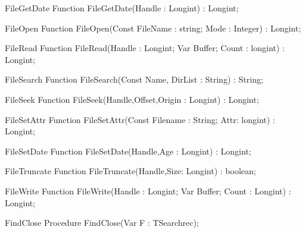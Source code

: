  
\begin{function}{FileGetDate}
\Declaration
Function FileGetDate(Handle : Longint) : Longint;
\Description
\Errors
\SeeAlso
\end{function}

 
\begin{function}{FileOpen}
\Declaration
Function FileOpen(Const FileName : string; Mode : Integer) : Longint;
\Description
\Errors
\SeeAlso
\end{function}

 
\begin{function}{FileRead}
\Declaration
Function FileRead(Handle : Longint; Var Buffer; Count : longint) : Longint;
\Description
\Errors
\SeeAlso
\end{function}

 
\begin{function}{FileSearch}
\Declaration
Function FileSearch(Const Name, DirList : String) : String;
\Description
\Errors
\SeeAlso
\end{function}

 
\begin{function}{FileSeek}
\Declaration
Function FileSeek(Handle,Offset,Origin : Longint) : Longint;
\Description
\Errors
\SeeAlso
\end{function}

 
\begin{function}{FileSetAttr}
\Declaration
Function FileSetAttr(Const Filename : String; Attr: longint) : Longint;
\Description
\Errors
\SeeAlso
\end{function}

 
\begin{function}{FileSetDate}
\Declaration
Function FileSetDate(Handle,Age : Longint) : Longint;
\Description
\Errors
\SeeAlso
\end{function}

 
\begin{function}{FileTruncate}
\Declaration
Function FileTruncate(Handle,Size: Longint) : boolean;
\Description
\Errors
\SeeAlso
\end{function}

 
\begin{function}{FileWrite}
\Declaration
Function FileWrite(Handle : Longint; Var Buffer; Count : Longint) : Longint;
\Description
\Errors
\SeeAlso
\end{function}

 
\begin{procedure}{FindClose}
\Declaration
Procedure FindClose(Var F : TSearchrec);
\Description
\Errors
\SeeAlso
\end{procedure}

